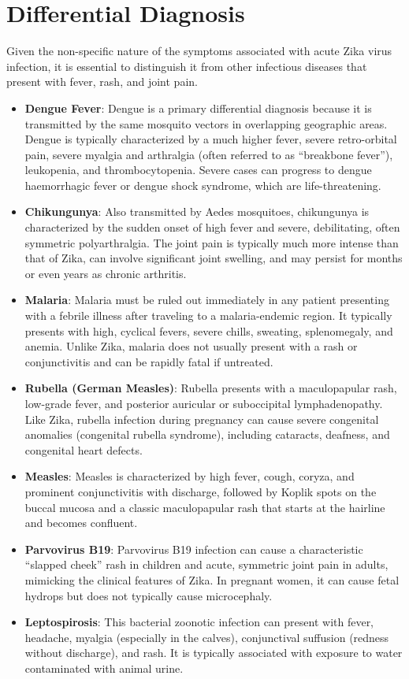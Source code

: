 \section*{Differential Diagnosis}
Given the non-specific nature of the symptoms associated with acute Zika virus infection, it is essential to distinguish it from other infectious diseases that present with fever, rash, and joint pain.
\begin{itemize}
\item \textbf{Dengue Fever}: Dengue is a primary differential diagnosis because it is transmitted by the same mosquito vectors in overlapping geographic areas. Dengue is typically characterized by a much higher fever, severe retro-orbital pain, severe myalgia and arthralgia (often referred to as ``breakbone fever''), leukopenia, and thrombocytopenia. Severe cases can progress to dengue haemorrhagic fever or dengue shock syndrome, which are life-threatening.
\item \textbf{Chikungunya}: Also transmitted by Aedes mosquitoes, chikungunya is characterized by the sudden onset of high fever and severe, debilitating, often symmetric polyarthralgia. The joint pain is typically much more intense than that of Zika, can involve significant joint swelling, and may persist for months or even years as chronic arthritis.
\item \textbf{Malaria}: Malaria must be ruled out immediately in any patient presenting with a febrile illness after traveling to a malaria-endemic region. It typically presents with high, cyclical fevers, severe chills, sweating, splenomegaly, and anemia. Unlike Zika, malaria does not usually present with a rash or conjunctivitis and can be rapidly fatal if untreated.
\item \textbf{Rubella (German Measles)}: Rubella presents with a maculopapular rash, low-grade fever, and posterior auricular or suboccipital lymphadenopathy. Like Zika, rubella infection during pregnancy can cause severe congenital anomalies (congenital rubella syndrome), including cataracts, deafness, and congenital heart defects.
\item \textbf{Measles}: Measles is characterized by high fever, cough, coryza, and prominent conjunctivitis with discharge, followed by Koplik spots on the buccal mucosa and a classic maculopapular rash that starts at the hairline and becomes confluent.
\item \textbf{Parvovirus B19}: Parvovirus B19 infection can cause a characteristic ``slapped cheek'' rash in children and acute, symmetric joint pain in adults, mimicking the clinical features of Zika. In pregnant women, it can cause fetal hydrops but does not typically cause microcephaly.
\item \textbf{Leptospirosis}: This bacterial zoonotic infection can present with fever, headache, myalgia (especially in the calves), conjunctival suffusion (redness without discharge), and rash. It is typically associated with exposure to water contaminated with animal urine.
\end{itemize}

